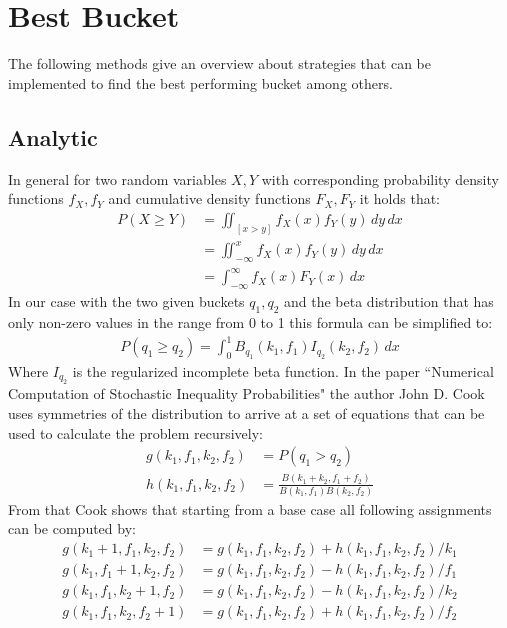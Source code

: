 \documentclass[../Thesis.tex]{subfiles}
\begin{document}
\section{Best Bucket}
The following methods give an overview about strategies that can be implemented to find the best performing bucket among others.

\subsection{Analytic} \label{ssec:analytic}
In general for two random variables $X,Y$ with corresponding probability density functions $f_X,f_Y$ and cumulative density functions $F_X,F_Y$ it holds that: 
\begin{align*}
P(X \geq Y ) &= \iint_{[x>y]} f_X(x)f_Y(y) \,dy\,dx \\
			 &= \iint_{-\infty}^{x} f_X(x)f_Y(y) \,dy\,dx \\
			 &= \int_{-\infty}^{\infty}f_X(x)F_Y(x)\,dx
\end{align*}
In our case with the two given buckets $q_1,q_2$ and the beta distribution that has only non-zero values in the range from 0 to 1 this formula can be simplified to:
\begin{align*}
P(q_1 \geq q_2 ) = \int_{0}^{1}B_{q_1}(k_1,f_1)I_{q_2}(k_2,f_2)\,dx
\end{align*}
Where $I_{q_2}$ is the regularized incomplete beta function. In the paper ``Numerical Computation of Stochastic Inequality Probabilities" the author John D. Cook~\cite{cook2008numerical} uses symmetries of the distribution to arrive at a set of equations that can be used to calculate the problem recursively:
\begin{align*}
g(k_1,f_1,k_2,f_2) &= P(q_1>q_2) \\
h(k_1,f_1,k_2,f_2) &= \frac{B(k_1+k_2,f_1+f_2)}{B(k_1,f_1)B(k_2,f_2)}
\end{align*}
From that Cook shows that starting from a base case all following assignments can be computed by:
\begin{align*}
g(k_1 + 1,f_1,k_2,f_2) &= g(k_1,f_1,k_2,f_2) + h(k_1,f_1,k_2,f_2)/k_1 \\
g(k_1,f_1 + 1,k_2,f_2) &= g(k_1,f_1,k_2,f_2) - h(k_1,f_1,k_2,f_2)/f_1 \\
g(k_1,f_1,k_2 + 1,f_2) &= g(k_1,f_1,k_2,f_2) - h(k_1,f_1,k_2,f_2)/k_2 \\
g(k_1,f_1,k_2,f_2 + 1) &= g(k_1,f_1,k_2,f_2) + h(k_1,f_1,k_2,f_2)/f_2 \\
\end{align*}
\end{document}
